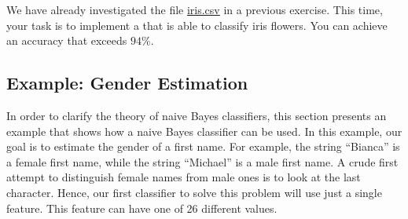 \exercise
We have already investigated the file
\href{https://github.com/karlstroetmann/Artificial-Intelligence/blob/master/Python/iris.csv}{iris.csv}
in a previous exercise.   This time, your task is to implement a  that is able to
classify iris flowers.  You can achieve an accuracy that exceeds $94\%$.
\eox

\subsection{Example: Gender Estimation}
In order to clarify the theory of naive Bayes classifiers, this section presents an example that shows how a
naive Bayes classifier can be used.  In this example, our goal is to estimate the gender of a first name.  For
example, the string ``Bianca'' is a female first name, while the string ``Michael'' is a male first name.
A crude first attempt to distinguish female names from male ones is to look at the last character.  Hence, our
first classifier to solve this problem will use just a single feature.  This feature can have one of 26
different values.
 
